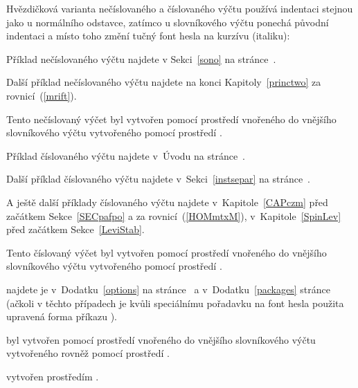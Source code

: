 \noindent
Hvězdičková varianta nečíslovaného a číslovaného výčtu používá indentaci
stejnou jako u normálního odstavce, zatímco u slovníkového výčtu ponechá
původní indentaci a místo toho změní tučný font hesla na kurzívu (italiku):

\begin{description*}
\item[Nečíslovaný výčet:]\label{staredesciitem} \mbox{}\par
  \begin{itemize*}
  \item\label{stariitema} Příklad nečíslovaného výčtu najdete v
    Sekci~\ref{sono} na stránce~\pageref{sono}.
  \item\label{stariitemb} Další příklad nečíslovaného výčtu najdete na konci
    Kapitoly~\ref{princtwo} za rovnicí~(\ref{mrift}).
  \item\label{stariitemc} Tento nečíslovaný výčet byl vytvořen pomocí
    prostředí  vnořeného do vnějšího slovníkového výčtu
    vytvořeného pomocí prostředí .
  \end{itemize*}
\item[Číslovaný výčet:]\label{staredescienum} \mbox{}\par
  \begin{enumerate*}
  \item\label{starienuma} Příklad číslovaného výčtu najdete v~Úvodu na
    stránce~\pageref{easyuse}.
  \item\label{starienumb} Další příklad číslovaného výčtu najdete
    v~Sekci~\ref{instsepar} na stránce~\pageref{instsepar}.
  \item\label{starienumc} A ještě další příklady číslovaného výčtu najdete
    v~Kapitole~\ref{CAPczm} před začátkem Sekce~\ref{SECpafpo} a za
    rovnicí~(\ref{HOMmtxM}), v~Kapitole~\ref{SpinLev} před začátkem
    Sekce~\ref{LeviStab}.
  \item\label{starienumd} Tento číslovaný výčet byl vytvořen pomocí prostředí
     vnořeného do vnějšího slovníkového výčtu vytvořeného
    pomocí prostředí .
  \end{enumerate*}
\item[Slovníkový výčet:]\label{staredescidesc} \mbox{}\par
  \begin{description*}
  \item[Příklady slovníkového výčtu:]\label{staridesca} najdete je
    v~Dodatku~\ref{options} na stránce~\pageref{options} a
    v~Dodatku~\ref{packages} stránce~\pageref{packages} (ačkoli v těchto
    případech je kvůli speciálnímu pořadavku na font hesla použita upravená
    forma příkazu ).
  \item[Tento výčet:]\label{staridescb} byl vytvořen pomocí prostředí
     vnořeného do vnějšího slovníkového výčtu vytvořeného
    rovněž pomocí prostředí .
  \end{description*}
\item[Tento vnější slovníkový výčet:]\label{staredesc} vytvořen prostředím
  .
\end{description*}


